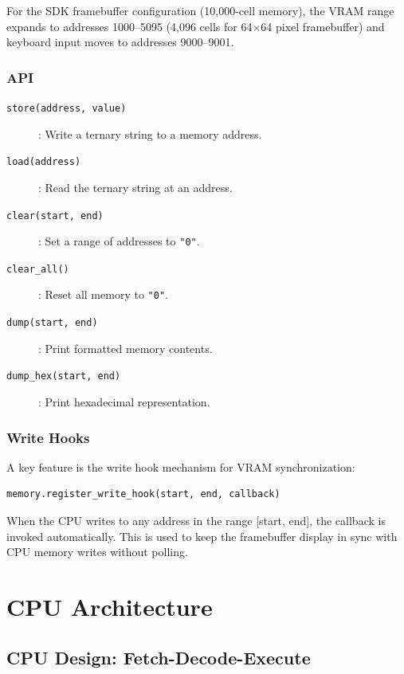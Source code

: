 \documentclass[10pt,a4paper,twoside]{book}
\begin{document}
For the SDK framebuffer configuration (10,000-cell memory), the VRAM range expands to
addresses 1000--5095 (4,096 cells for 64$\times$64 pixel framebuffer) and keyboard
input moves to addresses 9000--9001.

\section{API}

\begin{description}
    \item[\texttt{store(address, value)}]: Write a ternary string to a memory address.
    \item[\texttt{load(address)}]: Read the ternary string at an address.
    \item[\texttt{clear(start, end)}]: Set a range of addresses to \texttt{"0"}.
    \item[\texttt{clear\_all()}]: Reset all memory to \texttt{"0"}.
    \item[\texttt{dump(start, end)}]: Print formatted memory contents.
    \item[\texttt{dump\_hex(start, end)}]: Print hexadecimal representation.
\end{description}

\section{Write Hooks}

A key feature is the write hook mechanism for VRAM synchronization:
\begin{verbatim}
memory.register_write_hook(start, end, callback)
\end{verbatim}

When the CPU writes to any address in the range [start, end], the callback is invoked
automatically. This is used to keep the framebuffer display in sync with CPU memory
writes without polling.

\part{CPU Architecture}

\chapter{CPU Design: Fetch-Decode-Execute}
\label{ch:cpu}
\end{document}
